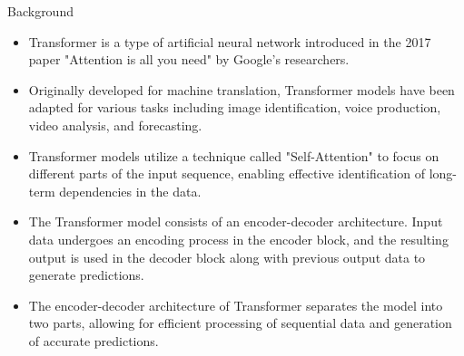 

\begin{frame}{Background}

\begin{itemize}
	\item Transformer is a type of artificial neural network introduced in the 2017 paper "Attention is all you need" by Google's researchers.
	\item Originally developed for machine translation, Transformer models have been adapted for various tasks including image identification, voice production, video analysis, and forecasting.
	\item Transformer models utilize a technique called "Self-Attention" to focus on different parts of the input sequence, enabling effective identification of long-term dependencies in the data.\newpage
	\item The Transformer model consists of an encoder-decoder architecture. Input data undergoes an encoding process in the encoder block, and the resulting output is used in the decoder block along with previous output data to generate predictions.
	\item The encoder-decoder architecture of Transformer separates the model into two parts, allowing for efficient processing of sequential data and generation of accurate predictions.\cite{Jittanon:2023}
\end{itemize}

\end{frame}
	

